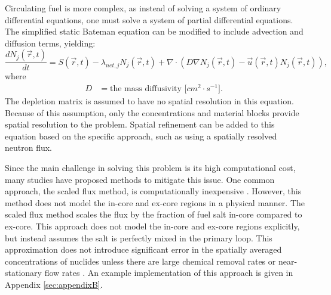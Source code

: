 
Circulating fuel is more complex, as instead of solving a system of ordinary differential equations, one must solve a system of partial differential equations.
The simplified static Bateman equation can be modified to include advection and diffusion terms, yielding:
\begin{equation}
    \frac{dN_j(\vec{r}, t)}{dt} = S(\vec{r}, t) - \lambda_{net, j} N_j(\vec{r}, t) + \nabla \cdot \left( D \nabla N_{j} (\vec{r}, t) - \vec{u}(\vec{r}, t) N_{j} (\vec{r}, t) \right),
    \label{eq:bate-flow-simple}
\end{equation}
where
\begin{align}
D &= \mbox{the mass diffusivity [$cm^2 \cdot s^{-1}$]. } \nonumber
\end{align}
The depletion matrix is assumed to have no spatial resolution in this equation.
Because of this assumption, only the concentrations and material blocks provide spatial resolution to the problem.
Spatial refinement can be added to this equation based on the specific approach, such as using a spatially resolved neutron flux.




Since the main challenge in solving this problem is its high computational cost, many studies have proposed methods to mitigate this issue.
One common approach, the scaled flux method, is computationally inexpensive \cite{betzler_liquid-fueled_2021}.
However, this method does not model the in-core and ex-core regions in a physical manner.
The scaled flux method scales the flux by the fraction of fuel salt in-core compared to ex-core.
This approach does not model the in-core and ex-core regions explicitly, but instead assumes the salt is perfectly mixed in the primary loop.
This approximation does not introduce significant error in the spatially averaged concentrations of nuclides unless there are large chemical removal rates or near-stationary flow rates \cite{seifert_luke_computationally_2025}.
An example implementation of this approach is given in Appendix \ref{sec:appendixB}.

